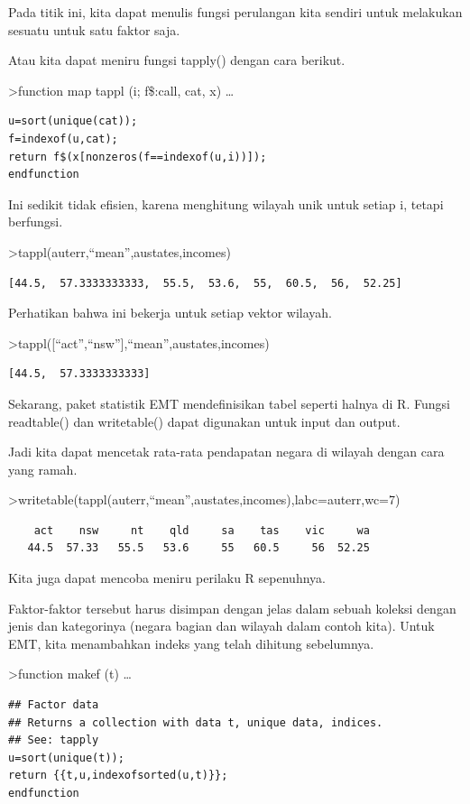 \documentclass[
]{book}
\begin{document}
Pada titik ini, kita dapat menulis fungsi perulangan kita sendiri untuk melakukan sesuatu untuk satu faktor saja.

Atau kita dapat meniru fungsi tapply() dengan cara berikut.

\textgreater function map tappl (i; f\$:call, cat, x) \ldots{}

\begin{verbatim}
u=sort(unique(cat));
f=indexof(u,cat);
return f$(x[nonzeros(f==indexof(u,i))]);
endfunction
\end{verbatim}

Ini sedikit tidak efisien, karena menghitung wilayah unik untuk setiap i, tetapi berfungsi.

\textgreater tappl(auterr,``mean'',austates,incomes)

\begin{verbatim}
[44.5,  57.3333333333,  55.5,  53.6,  55,  60.5,  56,  52.25]
\end{verbatim}

Perhatikan bahwa ini bekerja untuk setiap vektor wilayah.

\textgreater tappl({[}``act'',``nsw''{]},``mean'',austates,incomes)

\begin{verbatim}
[44.5,  57.3333333333]
\end{verbatim}

Sekarang, paket statistik EMT mendefinisikan tabel seperti halnya di R. Fungsi readtable() dan writetable() dapat digunakan untuk input dan output.

Jadi kita dapat mencetak rata-rata pendapatan negara di wilayah dengan cara yang ramah.

\textgreater writetable(tappl(auterr,``mean'',austates,incomes),labc=auterr,wc=7)

\begin{verbatim}
    act    nsw     nt    qld     sa    tas    vic     wa
   44.5  57.33   55.5   53.6     55   60.5     56  52.25
\end{verbatim}

Kita juga dapat mencoba meniru perilaku R sepenuhnya.

Faktor-faktor tersebut harus disimpan dengan jelas dalam sebuah koleksi dengan jenis dan kategorinya (negara bagian dan wilayah dalam contoh kita). Untuk EMT, kita menambahkan indeks yang telah dihitung sebelumnya.

\textgreater function makef (t) \ldots{}

\begin{verbatim}
## Factor data
## Returns a collection with data t, unique data, indices.
## See: tapply
u=sort(unique(t));
return {{t,u,indexofsorted(u,t)}};
endfunction
\end{verbatim}
\end{document}
